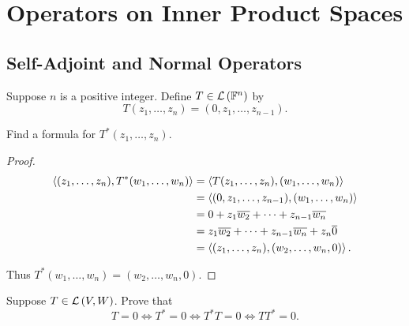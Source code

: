 \chapter{Operators on Inner Product Spaces}

\section{Self-Adjoint and Normal Operators}

\begin{exercise}
    Suppose $n$ is a positive integer. Define $T\in\mathcal{L}\left({\mathbb{F}^{n}}\right)$ by
    \[
        T(z_{1}, \ldots, z_{n}) = (0, z_{1}, \ldots, z_{n-1}).
    \]

    Find a formula for $T^{*}(z_{1}, \ldots, z_{n})$.
\end{exercise}

\begin{proof}
    \begin{align*}
        \left\langle{(z_{1}, \ldots, z_{n}), T^{*}(w_{1}, \ldots, w_{n})}\right\rangle & = \left\langle{T(z_{1}, \ldots, z_{n}), (w_{1}, \ldots, w_{n})}\right\rangle      \\
                                                                        & = \left\langle{(0, z_{1}, \ldots, z_{n-1}), (w_{1}, \ldots, w_{n})}\right\rangle  \\
                                                                        & = 0 + z_{1}\overline{w_{2}} + \cdots + z_{n-1}\overline{w_{n}}             \\
                                                                        & = z_{1}\overline{w_{2}} + \cdots + z_{n-1}\overline{w_{n}} + z_{n}\overline{0} \\
                                                                        & = \left\langle{(z_{1}, \ldots, z_{n}), (w_{2}, \ldots, w_{n}, 0)}\right\rangle.
    \end{align*}

    Thus $T^{*}(w_{1}, \ldots, w_{n}) = (w_{2}, \ldots, w_{n}, 0)$.
\end{proof}
\newpage

\begin{exercise}
    Suppose $T\in\mathcal{L}\left({V, W}\right)$. Prove that
    \[
        T = 0 \Longleftrightarrow T^{*} = 0 \Longleftrightarrow T^{*}T = 0 \Longleftrightarrow TT^{*} = 0.
    \]
\end{exercise}

